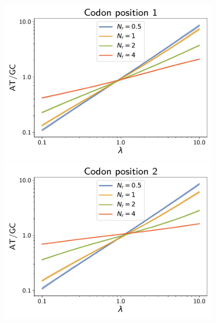 \documentclass{article}
\begin{document}
\begin{figure}[h]
 \centering
 \begin{minipage}{0.32\linewidth}
 \includegraphics[width=\linewidth, page=1]{simulations/at_over_gc_1}
 \end{minipage}
 \hfill
 \begin{minipage}{0.32\linewidth}
 \includegraphics[width=\linewidth, page=1]{simulations/at_over_gc_2}
 \end{minipage}
 \hfill
 \begin{minipage}{0.32\linewidth}

\end{minipage}
\end{figure}
\end{document}
